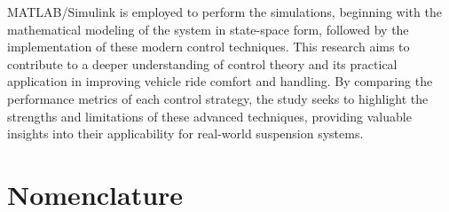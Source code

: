 MATLAB/Simulink is employed to perform the simulations, beginning with the mathematical modeling of the system in state-space form, followed by the implementation of these modern control techniques. This research aims to contribute to a deeper understanding of control theory and its practical application in improving vehicle ride comfort and handling. By comparing the performance metrics of each control strategy, the study seeks to highlight the strengths and limitations of these advanced techniques, providing valuable insights into their applicability for real-world suspension systems.

\tableofcontents
\listoffigures
\listoftables

\chapter*{Nomenclature}

